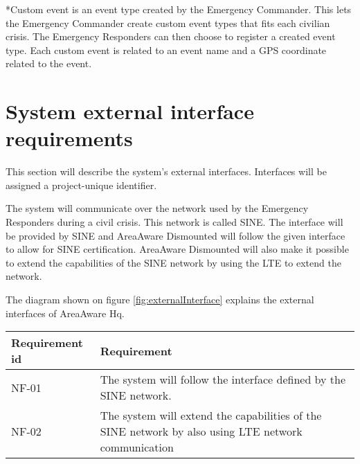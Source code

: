 *Custom event is an event type created by the Emergency Commander. This lets the Emergency Commander create custom event types that fits each civilian crisis. The Emergency Responders can then choose to register a created event type. Each custom event is related to an event name and a GPS coordinate related to the event.

\FloatBarrier
\newpage

\label{sec_nonFunc1}
\section{System external interface requirements}
This section will describe the system’s external interfaces. Interfaces will be assigned a project-unique identifier. 

The system will communicate over the network used by the Emergency Responders during a civil crisis. This network is called SINE. The interface will be provided by SINE and AreaAware Dismounted will follow the given interface to allow for SINE certification. AreaAware Dismounted will also make it possible to extend the capabilities of the SINE network by using the LTE to extend the network. 

The diagram shown on figure \ref{fig:externalInterface} explains the external interfaces of AreaAware Hq.


\begin{longtable}{| p{3.2cm} |  p{10cm} | }
	\hline
	\textbf{Requirement id} &  \textbf{Requirement } \\
	\hline
	NF-01 & The system will follow the interface defined by the SINE network.  \\
	\hline
	NF-02 & The system will extend the capabilities of the SINE network by also using LTE network communication  \\
	\hline
\end{longtable}

